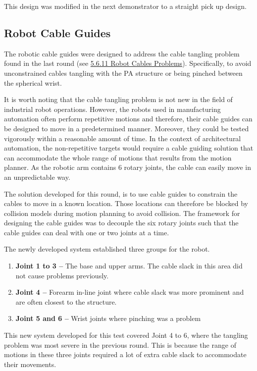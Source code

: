 

This design was modified in the next demonstrator to a straight pick up design.

\subsection{Robot Cable Guides}

The robotic cable guides were designed to address the cable tangling problem found in the last round (see \ul{5.6.11 Robot Cables Problems}). Specifically, to avoid unconstrained cables tangling with the PA structure or being pinched between the spherical wrist. 

It is worth noting that the cable tangling problem is not new in the field of industrial robot operations. However, the robots used in manufacturing automation often perform repetitive motions and therefore, their cable guides can be designed to move in a predetermined manner. Moreover, they could be tested vigorously within a reasonable amount of time. In the context of architectural automation, the non-repetitive targets would require a cable guiding solution that can accommodate the whole range of motions that results from the motion planner. As the robotic arm contains 6 rotary joints, the cable can easily move in an unpredictable way.

The solution developed for this round, is to use cable guides to constrain the cables to move in a known location. Those locations can therefore be blocked by collision models during motion planning to avoid collision. The framework for designing the cable guides was to decouple the six rotary joints such that the cable guides can deal with one or two joints at a time. 

The newly developed system established three groups for the robot.

\begin{enumerate}
	\item \textbf{Joint 1 to 3 --} The base and upper arms. The cable slack in this area did not cause problems previously.

	\item \textbf{Joint 4 --} Forearm in-line joint where cable slack was more prominent and are often closest to the structure.

	\item \textbf{Joint 5 and 6 --} Wrist joints where pinching was a problem

\end{enumerate}
This new system developed for this test covered Joint 4 to 6, where the tangling problem was most severe in the previous round. This is because the range of motions in these three joints required a lot of extra cable slack to accommodate their movements. 

